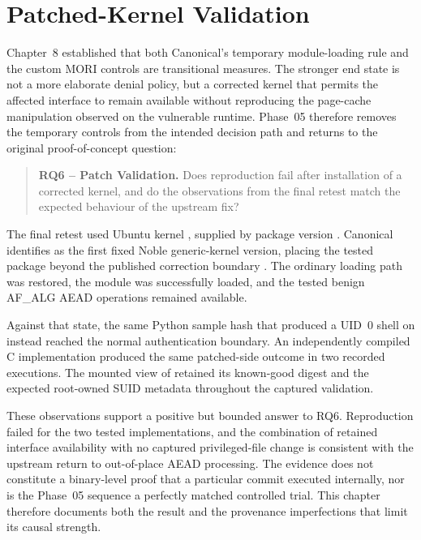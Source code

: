 \section{Patched-Kernel Validation}
\label{sec:patched-kernel-validation}

Chapter~8 established that both Canonical's temporary module-loading rule and
the custom MORI controls are transitional measures. The stronger end state is
not a more elaborate denial policy, but a corrected kernel that permits the
affected interface to remain available without reproducing the page-cache
manipulation observed on the vulnerable runtime. Phase~05 therefore removes the
temporary controls from the intended decision path and returns to the original
proof-of-concept question:

\begin{quote}
\textbf{RQ6 -- Patch Validation.} Does reproduction fail after installation of
a corrected kernel, and do the observations from the final retest match the
expected behaviour of the upstream fix?
\end{quote}

The final retest used Ubuntu kernel , supplied by
package version . Canonical identifies
 as the first fixed Noble generic-kernel version, placing
the tested package beyond the published correction boundary
\cite{ubuntu-copyfail-cve}. The ordinary  loading path was
restored, the module was successfully loaded, and the tested benign AF\_ALG
AEAD operations remained available.

Against that state, the same Python sample hash that produced a UID~0 shell on
 instead reached the normal 
authentication boundary. An independently compiled C implementation produced
the same patched-side outcome in two recorded executions. The mounted view of
 retained its known-good digest and the expected root-owned
SUID metadata throughout the captured validation.

These observations support a positive but bounded answer to RQ6. Reproduction
failed for the two tested implementations, and the combination of retained
interface availability with no captured privileged-file change is consistent
with the upstream return to out-of-place AEAD processing. The evidence does not
constitute a binary-level proof that a particular commit executed internally,
nor is the Phase~05 sequence a perfectly matched controlled trial. This chapter
therefore documents both the result and the provenance imperfections that limit
its causal strength.

